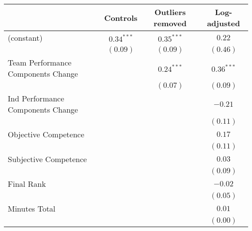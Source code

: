 
\begin{table}
\begin{center}
\begin{tabular}{l c c c }
\toprule
 & Controls & Outliers removed & Log-adjusted \\
\midrule
(constant)                                               & $\mathbf{0.34}^{***}$ & $\mathbf{0.35}^{***}$ & $0.22$                \\
                                                         & $(0.09)$              & $(0.09)$              & $(0.46)$              \\
Team Performance Components Change                       &                       & $\mathbf{0.24}^{***}$ & $\mathbf{0.36}^{***}$ \\
                                                         &                       & $(0.07)$              & $(0.09)$              \\
Ind Performance Components Change                        &                       &                       & $-0.21$               \\
                                                         &                       &                       & $(0.11)$              \\
Objective Competence                                     &                       &                       & $0.17$                \\
                                                         &                       &                       & $(0.11)$              \\
Subjective Competence                                    &                       &                       & $0.03$                \\
                                                         &                       &                       & $(0.09)$              \\
Final Rank                                               &                       &                       & $-0.02$               \\
                                                         &                       &                       & $(0.05)$              \\
Minutes Total                                            &                       &                       & $0.01$                \\
                                                         &                       &                       & $(0.00)$              \\

\end{tabular}
\end{center}
\end{table}
